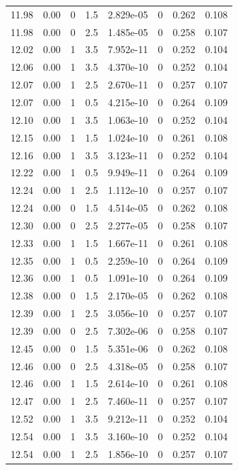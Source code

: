 \documentclass[preview]{standalone}
\begin{document}
{{{{{{{{{\begin{tabular}{L{1.2cm}C{1.2cm} C{0.3cm}C{0.5cm} C{1.4cm}C{1.4cm} C{1.4cm}C{1.4cm}}
  11.98  &  0.00  & 0     & 1.5 &  2.829e-05  & 0  & 0.262 &  0.108   \\ 
  11.98  &  0.00  & 0     & 2.5 &  1.485e-05  & 0  & 0.258 &  0.107   \\ 
  12.02  &  0.00  & 1     & 3.5 &  7.952e-11  & 0  & 0.252 &  0.104   \\ 
  12.06  &  0.00  & 1     & 3.5 &  4.370e-10  & 0  & 0.252 &  0.104   \\ 
  12.07  &  0.00  & 1     & 2.5 &  2.670e-11  & 0  & 0.257 &  0.107   \\ 
  12.07  &  0.00  & 1     & 0.5 &  4.215e-10  & 0  & 0.264 &  0.109   \\ 
  12.10  &  0.00  & 1     & 3.5 &  1.063e-10  & 0  & 0.252 &  0.104   \\ 
  12.15  &  0.00  & 1     & 1.5 &  1.024e-10  & 0  & 0.261 &  0.108   \\ 
  12.16  &  0.00  & 1     & 3.5 &  3.123e-11  & 0  & 0.252 &  0.104   \\ 
  12.22  &  0.00  & 1     & 0.5 &  9.949e-11  & 0  & 0.264 &  0.109   \\ 
  12.24  &  0.00  & 1     & 2.5 &  1.112e-10  & 0  & 0.257 &  0.107   \\ 
  12.24  &  0.00  & 0     & 1.5 &  4.514e-05  & 0  & 0.262 &  0.108   \\ 
  12.30  &  0.00  & 0     & 2.5 &  2.277e-05  & 0  & 0.258 &  0.107   \\ 
  12.33  &  0.00  & 1     & 1.5 &  1.667e-11  & 0  & 0.261 &  0.108   \\ 
  12.35  &  0.00  & 1     & 0.5 &  2.259e-10  & 0  & 0.264 &  0.109   \\ 
  12.36  &  0.00  & 1     & 0.5 &  1.091e-10  & 0  & 0.264 &  0.109   \\ 
  12.38  &  0.00  & 0     & 1.5 &  2.170e-05  & 0  & 0.262 &  0.108   \\ 
  12.39  &  0.00  & 1     & 2.5 &  3.056e-10  & 0  & 0.257 &  0.107   \\ 
  12.39  &  0.00  & 0     & 2.5 &  7.302e-06  & 0  & 0.258 &  0.107   \\ 
  12.45  &  0.00  & 0     & 1.5 &  5.351e-06  & 0  & 0.262 &  0.108   \\ 
  12.46  &  0.00  & 0     & 2.5 &  4.318e-05  & 0  & 0.258 &  0.107   \\ 
  12.46  &  0.00  & 1     & 1.5 &  2.614e-10  & 0  & 0.261 &  0.108   \\ 
  12.47  &  0.00  & 1     & 2.5 &  7.460e-11  & 0  & 0.257 &  0.107   \\ 
  12.52  &  0.00  & 1     & 3.5 &  9.212e-11  & 0  & 0.252 &  0.104   \\ 
  12.54  &  0.00  & 1     & 3.5 &  3.160e-10  & 0  & 0.252 &  0.104   \\ 
  12.54  &  0.00  & 1     & 2.5 &  1.856e-10  & 0  & 0.257 &  0.107   \\ 
\hline 
\end{tabular} 

}}}}}}}}}
\end{document}
